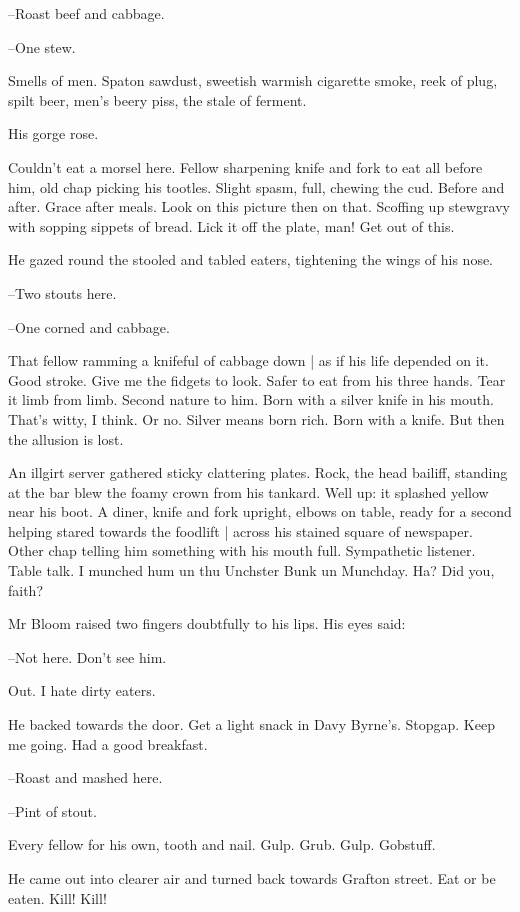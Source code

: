 --Roast beef and cabbage.

--One stew.

Smells of men.
Spaton sawdust,
sweetish warmish cigarette smoke,
reek of plug, spilt beer,
men's beery piss,
the stale of ferment.

His gorge rose.

Couldn't eat a morsel here.
Fellow sharpening knife and fork to eat all before him,
old chap picking his tootles.
Slight spasm, full, chewing the cud.
Before and after.
Grace after meals.
Look on this picture then on that.
Scoffing up stewgravy with sopping sippets of bread.
Lick it off the plate, man!
Get out of this.

He gazed round the stooled and tabled eaters,
tightening the wings of his nose.

--Two stouts here.

--One corned and cabbage.

That fellow ramming a knifeful of cabbage down |
as if his life depended on it.
Good stroke.
Give me the fidgets to look.
Safer to eat from his three hands.
Tear it limb from limb.
Second nature to him.
Born with a silver knife in his mouth.
That's witty, I think.
Or no.
Silver means born rich.
Born with a knife.
But then the allusion is lost.

An illgirt server gathered sticky clattering plates.
Rock, the head bailiff,
standing at the bar blew the foamy crown from his tankard.
Well up:
it splashed yellow near his boot.
A diner, knife and fork upright,
elbows on table,
ready for a second helping stared towards the foodlift |
across his stained square of newspaper.
Other chap telling him something with his mouth full.
Sympathetic listener.
Table talk.
I munched hum un thu Unchster Bunk un Munchday.
Ha?
Did you, faith?

Mr Bloom raised two fingers doubtfully to his lips.
His eyes said:

--Not here.
Don't see him.

Out.
I hate dirty eaters.

He backed towards the door.
Get a light snack in Davy Byrne's.
Stopgap.
Keep me going.
Had a good breakfast.

--Roast and mashed here.

--Pint of stout.

Every fellow for his own, tooth and nail.
Gulp.
Grub.
Gulp.
Gobstuff.

He came out into clearer air and turned back towards Grafton street.
Eat or be eaten.
Kill!
Kill!

